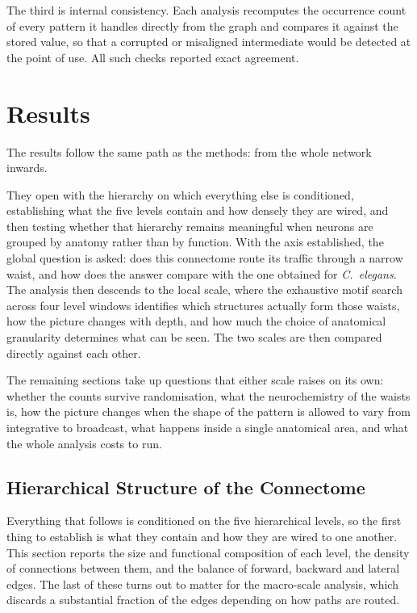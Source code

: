 \documentclass[12pt,a4paper,oneside]{article}
\theoremstyle{definition}
\theoremstyle{plain}
\begin{document}
The third is internal consistency. Each analysis recomputes the occurrence
count of every pattern it handles directly from the graph and compares it
against the stored value, so that a corrupted or misaligned intermediate
would be detected at the point of use. All such checks reported exact
agreement.

\section{Results}
\label{sec:results}

The results follow the same path as the methods: from the whole network
inwards.

They open with the hierarchy on which everything else is conditioned,
establishing what the five levels contain and how densely they are wired,
and then testing whether that hierarchy remains meaningful when neurons are
grouped by anatomy rather than by function. With the axis established, the
global question is asked: does this connectome route its traffic through a
narrow waist, and how does the answer compare with the one obtained for
\textit{C.\ elegans}. The analysis then descends to the local scale, where
the exhaustive motif search across four level windows identifies which
structures actually form those waists, how the picture changes with depth,
and how much the choice of anatomical granularity determines what can be
seen. The two scales are then compared directly against each other.

The remaining sections take up questions that either scale raises on its own:
whether the counts survive randomisation, what the neurochemistry of the
waists is, how the picture changes when the shape of the pattern is allowed
to vary from integrative to broadcast, what happens inside a single
anatomical area, and what the whole analysis costs to run.

\subsection{Hierarchical Structure of the Connectome}
\label{sec:results-hierarchy}


Everything that follows is conditioned on the five hierarchical levels, so
the first thing to establish is what they contain and how they are wired to
one another. This section reports the size and functional composition of
each level, the density of connections between them, and the balance of
forward, backward and lateral edges. The last of these turns out to matter
for the macro-scale analysis, which discards a substantial fraction of the
edges depending on how paths are routed.
\end{document}
